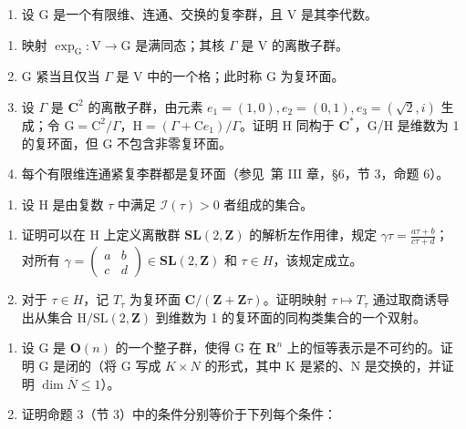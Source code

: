 
\begin{enumerate}
\def\labelenumi{\arabic{enumi})}
\tightlist
\item
  设 \(\mathrm{G}\) 是一个有限维、连通、交换的复李群，且 \(\mathrm{V}\) 是其李代数。
\end{enumerate}

\begin{enumerate}
\def\labelenumi{\alph{enumi})}
\item
  映射 \(\exp_{\mathrm{G}}: \mathrm{V} \to \mathrm{G}\) 是满同态；其核 \(\Gamma\) 是 \(\mathrm{V}\) 的离散子群。
\item
  G 紧当且仅当 \(\Gamma\) 是 V 中的一个格；此时称 G 为复环面。
\item
  设 \(\Gamma\) 是 \(\mathbf{C}^2\) 的离散子群，由元素 \(e_1 = (1,0), e_2 = (0,1), e_3 = (\sqrt{2},i)\) 生成；令 \(\mathrm{G} = \mathrm{C}^2 / \Gamma\)，\(\mathrm{H} = (\Gamma + \mathrm{C}e_1) / \Gamma\)。证明 H 同构于 \(\mathbf{C}^*\)，G/H 是维数为 1 的复环面，但 G 不包含非零复环面。
\item
  每个有限维连通紧复李群都是复环面（参见~第 III 章，§6，节 3，命题 6）。
\end{enumerate}

\begin{enumerate}
\def\labelenumi{\arabic{enumi})}
\setcounter{enumi}{1}
\tightlist
\item
  设 H 是由复数 \(\tau\) 中满足 \(\mathcal{I}(\tau) > 0\) 者组成的集合。
\end{enumerate}

\begin{enumerate}
\def\labelenumi{\alph{enumi})}
\item
  证明可以在 H 上定义离散群 \(\mathbf{SL}(2,\mathbf{Z})\) 的解析左作用律，规定 \(\gamma\tau=\frac{a\tau+b}{c\tau+d}\)；对所有 \(\gamma=\begin{pmatrix}a&b\\ c&d\end{pmatrix}\in\mathbf{SL}(2,\mathbf{Z})\) 和 \(\tau\in H\)，该规定成立。
\item
  对于 \(\tau\in H\)，记 \(T_{\tau}\) 为复环面 \(\mathbf{C}/(\mathbf{Z}+\mathbf{Z}\tau)\)。证明映射 \(\tau\mapsto T_{\tau}\) 通过取商诱导出从集合 \(\mathrm{H}/\mathrm{SL}(2,\mathbf{Z})\) 到维数为 1 的复环面的同构类集合的一个双射。
\end{enumerate}

\begin{enumerate}
\def\labelenumi{\arabic{enumi})}
\setcounter{enumi}{2}
\item
  设 G 是 \(\mathbf{O}(n)\) 的一个整子群，使得 G 在 \(\mathbf{R}^{n}\) 上的恒等表示是不可约的。证明 G 是闭的（将 G 写成 \(K \times N\) 的形式，其中 K 是紧的、N 是交换的，并证明 \(\dim \overline{N} \leq 1\)）。
\item
  证明命题 3（节 3）中的条件分别等价于下列每个条件：
\end{enumerate}

